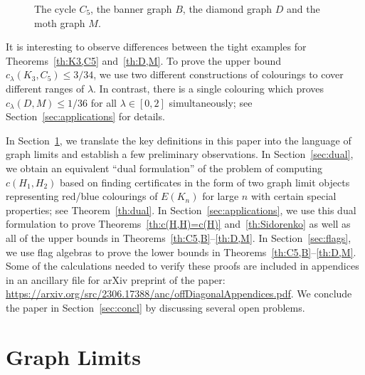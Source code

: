 \documentclass[12pt]{article}
\numberwithin{equation}{section}
\newtheorem{thm}[equation]{Theorem}
\theoremstyle{definition}
\theoremstyle{remark}
\begin{document}
\begin{figure}[htbp]
\begin{center}


\end{center}
 \caption{The cycle $C_5$, the banner graph $B$, the diamond graph $D$ and the moth graph $M$.}
 \label{fig:diamondMothBanner}
\end{figure}

It is interesting to observe differences between the tight examples for Theorems~\ref{th:K3,C5} and~\ref{th:D,M}. To prove the upper bound $c_\lambda(K_3,C_5)\leq 3/34$, we use two different constructions of colourings to cover different ranges of $\lambda$. In contrast, there is a single colouring which proves $c_\lambda(D,M)\leq 1/36$ for all $\lambda\in[0,2]$ simultaneously; see Section~\ref{sec:applications} for details. 



In Section~\ref{sec:limits}, we translate the key definitions in this paper into the language of graph limits and establish a few preliminary observations. In Section~\ref{sec:dual}, we obtain an equivalent ``dual formulation'' of the problem of computing $c(H_1,H_2)$ based on finding certificates in the form of two graph limit objects representing red/blue colourings of $E(K_n)$ for large $n$ with certain special properties; see Theorem~\ref{th:dual}. In Section~\ref{sec:applications}, we use this dual formulation to prove Theorems~\ref{th:c(H,H)=c(H)} and~\ref{th:Sidorenko} as well as all of the upper bounds in Theorems~\ref{th:C5,B}--\ref{th:D,M}. In Section~\ref{sec:flags}, we use flag algebras to prove the lower bounds in Theorems~\ref{th:C5,B}--\ref{th:D,M}. Some of the calculations needed to verify these proofs are included in appendices in an ancillary file for arXiv preprint of the paper: \url{https://arxiv.org/src/2306.17388/anc/offDiagonalAppendices.pdf}. We conclude the paper in Section~\ref{sec:concl} by discussing several open problems.


\section{Graph Limits} 
\label{sec:limits}
\end{document}

